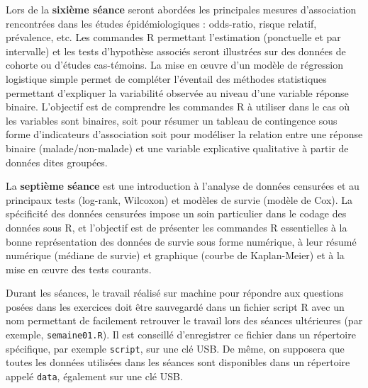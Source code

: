 \documentclass[11pt]{report}
\theoremstyle{definition}
\newcommand{\R}{\textsf{R}\xspace}
\newcommand{\Stata}{\textsf{Stata}\xspace}
\begin{document}
Lors de la \textbf{sixième séance} seront abordées les principales mesures
d'association rencontrées dans les études épidémiologiques : odds-ratio,
risque relatif, prévalence, etc. Les commandes \R permettant l'estimation
(ponctuelle et par intervalle) et les tests d'hypothèse associés seront
illustrées sur des données de cohorte ou d'études cas-témoins. La mise en
\oe uvre d'un modèle de régression logistique simple permet de compléter
l'éventail des méthodes statistiques permettant d'expliquer la variabilité
observée au niveau d'une variable réponse binaire. L'objectif est de
comprendre les commandes \R à utiliser dans le cas où les variables sont
binaires, soit pour résumer un tableau de contingence sous forme
d'indicateurs d'association soit pour modéliser la relation entre une
réponse binaire (malade/non-malade) et une variable explicative qualitative
à partir de données dites groupées.

La \textbf{septième séance} est une introduction à l'analyse de données
censurées et au principaux tests (log-rank, Wilcoxon) et modèles de survie
(modèle de Cox). La spécificité des données censurées impose un soin
particulier dans le codage des données sous \R, et l'objectif est de
présenter les commandes \R essentielles à la bonne représentation des
données de survie sous forme numérique, à leur résumé numérique (médiane de
survie) et graphique (courbe de Kaplan-Meier) et à la mise en \oe uvre des
tests courants. 


Durant les séances, le travail réalisé sur machine pour répondre aux
questions posées dans les exercices doit être sauvegardé dans un fichier
script R avec un nom permettant de facilement retrouver le travail lors des
séances ultérieures (par exemple, \texttt{semaine01.R}). Il est conseillé
d'enregistrer ce fichier dans un répertoire spécifique, par exemple
\texttt{script}, sur une clé USB. De même, on supposera que toutes les
données utilisées dans les séances sont disponibles dans un répertoire
appelé \texttt{data}, également sur une clé USB.
\end{document}
